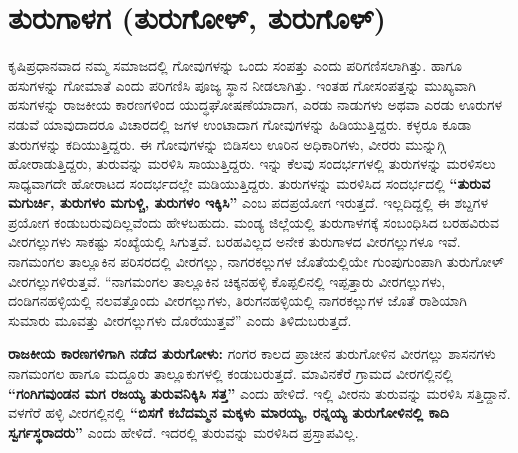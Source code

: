 \section*{ತುರುಗಾಳಗ (ತುರುಗೋಳ್​, ತುರುಗೊಳ್​)}

\vskip -2pt

ಕೃಷಿಪ್ರಧಾನವಾದ ನಮ್ಮ ಸಮಾಜದಲ್ಲಿ ಗೋವುಗಳನ್ನು ಒಂದು ಸಂಪತ್ತು ಎಂದು ಪರಿಗಣಿಸಲಾಗಿತ್ತು. ಹಾಗೂ ಹಸುಗಳನ್ನು ಗೋಮಾತೆ ಎಂದು ಪರಿಗಣಿಸಿ ಪೂಜ್ಯ ಸ್ಥಾನ ನೀಡಲಾಗಿತ್ತು. ಇಂತಹ ಗೋಸಂಪತ್ತನ್ನು ಮುಖ್ಯವಾಗಿ ಹಸುಗಳನ್ನು ರಾಜಕೀಯ ಕಾರಣಗಳಿಂದ ಯುದ್ಧಘೋಷಣೆಯಾದಾಗ, ಎರಡು ನಾಡುಗಳು ಅಥವಾ ಎರಡು ಊರುಗಳ ನಡುವೆ ಯಾವುದಾದರೂ ವಿಚಾರದಲ್ಲಿ ಜಗಳ ಉಂಟಾದಾಗ ಗೋವುಗಳನ್ನು ಹಿಡಿಯುತ್ತಿದ್ದರು. ಕಳ್ಳರೂ ಕೂಡಾ ತುರುಗಳನ್ನು ಕದಿಯುತ್ತಿದ್ದರು. ಈ ಗೋವುಗಳನ್ನು ಬಿಡಿಸಲು ಊರಿನ ಅಧಿಕಾರಿಗಳು, ವೀರರು ಮುನ್ನುಗ್ಗಿ ಹೋರಾಡುತ್ತಿದ್ದರು, ತುರುವನ್ನು ಮರಳಿಸಿ ಸಾಯುತ್ತಿದ್ದರು. ಇನ್ನು ಕೆಲವು ಸಂದರ್ಭಗಳಲ್ಲಿ ತುರುಗಳನ್ನು ಮರಳಿಸಲು ಸಾಧ್ಯವಾಗದೇ ಹೋರಾಟದ ಸಂದರ್ಭದಲ್ಲೇ ಮಡಿಯುತ್ತಿದ್ದರು. ತುರುಗಳನ್ನು ಮರಳಿಸಿದ ಸಂದರ್ಭದಲ್ಲಿ \textbf{“ತುರುವ ಮಗುರ್ಚಿ, ತುರುಗಳಂ ಮಗುಳ್ಚಿ, ತುರುಗಳಂ ಇಕ್ಕಿಸಿ”} ಎಂಬ ಪದಪ್ರಯೋಗ ಇರುತ್ತದೆ. ಇಲ್ಲದಿದ್ದಲ್ಲಿ ಈ ಶಬ್ದಗಳ ಪ್ರಯೋಗ ಕಂಡುಬರುವುದಿಲ್ಲವೆಂದು ಹೇಳಬಹುದು. ಮಂಡ್ಯ ಜಿಲ್ಲೆಯಲ್ಲಿ ತುರುಗಾಳಗಕ್ಕೆ ಸಂಬಂಧಿಸಿದ ಬರಹವಿರುವ ವೀರಗಲ್ಲುಗಳು ಸಾಕಷ್ಟು ಸಂಖ್ಯೆಯಲ್ಲಿ ಸಿಗುತ್ತವೆ. ಬರಹವಿಲ್ಲದ ಅನೇಕ ತುರುಗಾಳದ ವೀರಗಲ್ಲುಗಳೂ ಇವೆ. ನಾಗಮಂಗಲ ತಾಲ್ಲೂಕಿನ ಪರಿಸರದಲ್ಲಿ ವೀರಗಲ್ಲು, ನಾಗರಕಲ್ಲುಗಳ ಜೊತೆಯಲ್ಲಿಯೇ ಗುಂಪುಗುಂಪಾಗಿ ತುರುಗೋಳ್​ ವೀರಗಲ್ಲುಗಳಿರುತ್ತವೆ. “ನಾಗಮಂಗಲ ತಾಲ್ಲೂಕಿನ ಚಿಕ್ಕನಹಳ್ಳಿ ಕೊಪ್ಪಲಿನಲ್ಲಿ ಇಪ್ಪತ್ತಾರು ವೀರಗಲ್ಲುಗಳು, ದಂಡಿಗನಹಳ್ಳಿಯಲ್ಲಿ ನಲವತ್ತೊಂದು ವೀರಗಲ್ಲುಗಳು, ತಿರುಗನಹಳ್ಳಿಯಲ್ಲಿ ನಾಗರಕಲ್ಲುಗಳ ಜೊತೆ ರಾಶಿಯಾಗಿ ಸುಮಾರು ಮೂವತ್ತು ವೀರಗಲ್ಲುಗಳು ದೊರೆಯುತ್ತವೆ” ಎಂದು ತಿಳಿದುಬರುತ್ತದೆ.

\vskip -2pt

\textbf{ರಾಜಕೀಯ ಕಾರಣಗಳಿಗಾಗಿ ನಡೆದ ತುರುಗೋಳು: } ಗಂಗರ ಕಾಲದ ಪ್ರಾಚೀನ ತುರುಗೋಳಿನ ವೀರಗಲ್ಲು ಶಾಸನಗಳು ನಾಗಮಂಗಲ ಹಾಗೂ ಮದ್ದೂರು ತಾಲ್ಲೂಕುಗಳಲ್ಲಿ ಕಂಡುಬರುತ್ತದೆ. ಮಾವಿನಕೆರೆ ಗ್ರಾಮದ ವೀರಗಲ್ಲಿನಲ್ಲಿ \textbf{“ಗಂಗಿಗವುಂಡನ ಮಗ ರಜಯ್ಯ ತುರುವನಿಕ್ಕಿಸಿ ಸತ್ತ”} ಎಂದು ಹೇಳಿದೆ. ಇಲ್ಲಿ ವೀರನು ತುರುವನ್ನು ಮರಳಿಸಿ ಸತ್ತಿದ್ದಾನೆ. ವಳಗೆರೆ ಹಳ್ಳಿ ವೀರಗಲ್ಲಿನಲ್ಲಿ \textbf{“ಬಿಸಗೆ ಕಬೆದಮ್ಮನ ಮಕ್ಕಳು ಮಾರಯ್ಯ, ರನ್ನಯ್ಯ ತುರುಗೋಳಿನಲ್ಲಿ ಕಾದಿ ಸ್ವರ್ಗಸ್ಥರಾದರು”} ಎಂದು ಹೇಳಿದೆ. ಇದರಲ್ಲಿ ತುರುವನ್ನು ಮರಳಿಸಿದ ಪ್ರಸ್ತಾಪವಿಲ್ಲ.

